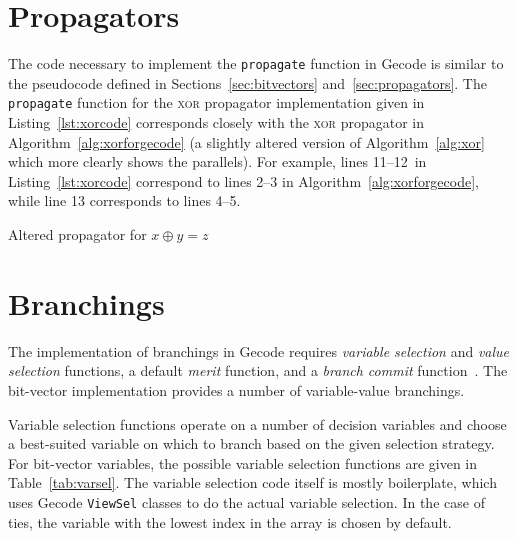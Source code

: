 \documentclass[a4paper,10pt,twoside,openright]{book}
\renewcommand{\sc}[1]{\textsc{\lowercase{#1}}}
\newcommand*\cd[1]{\texttt{#1}}
\begin{document}
\section{Propagators}
The code necessary to implement the \cd{propagate} function in Gecode is similar to the 
pseudocode defined in Sections~\ref{sec:bitvectors} and~\ref{sec:propagators}.
The \cd{propagate} function for the \sc{XOR} propagator implementation given in Listing~\ref{lst:xorcode} 
corresponds closely 
with the \sc{XOR} propagator in Algorithm~\ref{alg:xorforgecode} 
(a slightly altered version of Algorithm~\ref{alg:xor} which more clearly shows the parallels).
For example, lines 11--12~in Listing~\ref{lst:xorcode} correspond to lines 2--3 in Algorithm~\ref{alg:xorforgecode}, while line 13 corresponds to lines 4--5.

\begin{algorithm}
    \caption{Altered propagator for $x \oplus y = z$}
    \label{alg:xorforgecode}
    \begin{algorithmic}[1]
        
    \end{algorithmic}
\end{algorithm}
\section{Branchings}
The implementation of branchings in Gecode requires 
\textit{variable selection} and \textit{value selection} functions,
a default \textit{merit} function, 
and a \textit{branch commit} function~\cite{MPG:V}.
The bit-vector implementation provides a number of variable-value branchings.

Variable selection functions
operate on a number of decision variables and 
choose a best-suited variable 
on which to branch
based on the given selection strategy.
For bit-vector variables, 
the possible variable selection functions are given in Table~\ref{tab:varsel}.
The variable selection code itself is mostly boilerplate, 
which uses Gecode \cd{ViewSel} classes to do the actual variable selection.
In the case of ties, the variable with the lowest index in the array is chosen by default. 
\end{document}
